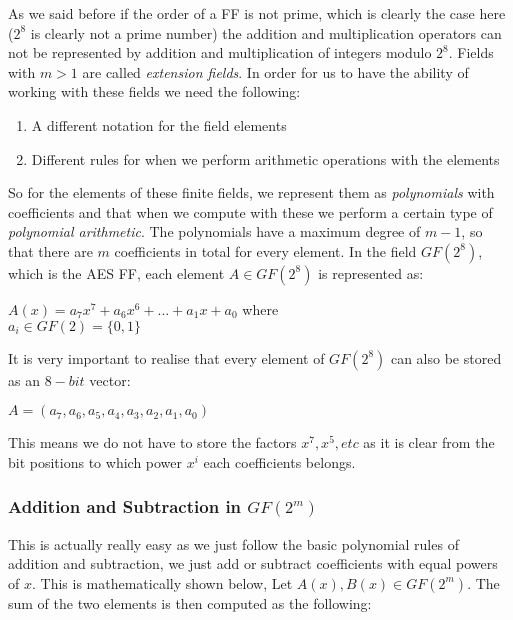 As we said before if the order of a FF is not prime, which is clearly the case here ($2^8$ is clearly not a prime number) the addition and multiplication operators can not be represented by addition and multiplication of integers modulo $2^8$. Fields with $m>1$ are called \textit{extension fields}. In order for us to have the ability of working with these fields we need the following:

\begin{enumerate}
\item{A different notation for the field elements}
\item{Different rules for when we perform arithmetic operations with the elements}
\end{enumerate}

So for the elements of these finite fields, we represent them as \textit{polynomials} with coefficients and that when we compute with these we perform a certain type of \textit{polynomial arithmetic}. The polynomials have a maximum degree of $m-1$, so that there are $m$ coefficients in total for every element. In the field $GF(2^8)$, which is the AES FF, each element $A \in GF(2^8)$ is represented as:

\begin{center}
$A(x) = a_7x^7 + a_6x^6 + ... + a_1x + a_0$ where \\
$a_i \in GF(2) = \{0,1\}$
\end{center}

It is very important to realise that every element of $GF(2^8)$ can also be stored as an $8-bit$ vector:

\begin{center}
$A = (a_7,a_6,a_5,a_4,a_3,a_2,a_1,a_0)$
\end{center}

This means we do not have to store the factors $x^7,x^5,etc$ as it is clear from the bit positions to which power $x^i$ each coefficients belongs.

\subsubsection{Addition and Subtraction in $GF(2^m)$}

This is actually really easy as we just follow the basic polynomial rules of addition and subtraction, we just add or subtract coefficients with equal powers of $x$. This is mathematically shown below, Let $A(x), B(x) \in GF(2^m)$. The sum of the two elements is then computed as the following: 

